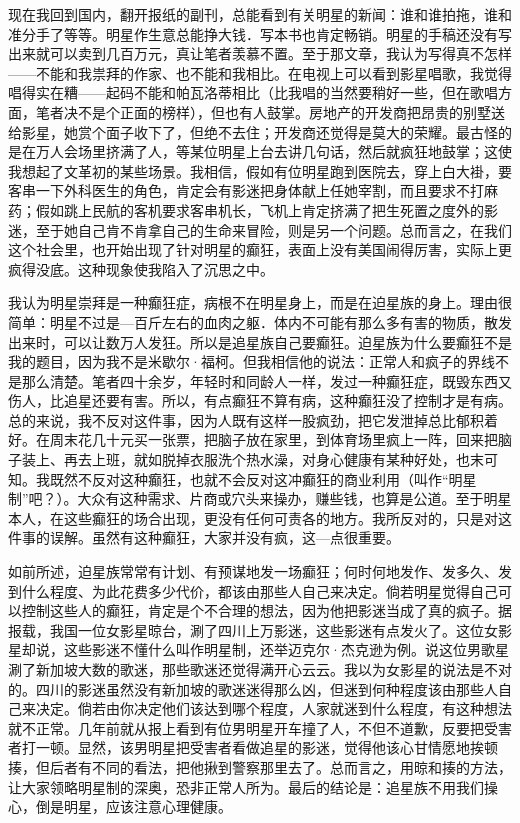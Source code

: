 现在我回到国内，翻开报纸的副刊，总能看到有关明星的新闻：谁和谁拍拖，谁和准分手了等等。明星作生意总能挣大钱．写本书也肯定畅销。明星的手稿还没有写出来就可以卖到几百万元，真让笔者羡慕不置。至于那文章，我认为写得真不怎样——不能和我祟拜的作家、也不能和我相比。在电视上可以看到影星唱歌，我觉得唱得实在糟——起码不能和帕瓦洛蒂相比（比我唱的当然要稍好一些，但在歌唱方面，笔者决不是个正面的榜样），但也有人鼓掌。房地产的开发商把昂贵的别墅送给影星，她赏个面子收下了，但绝不去住；开发商还觉得是莫大的荣耀。最古怪的是在万人会场里挤满了人，等某位明星上台去讲几句话，然后就疯狂地鼓掌；这使我想起了文革初的某些场景。我相信，假如有位明星跑到医院去，穿上白大褂，要客串一下外科医生的角色，肯定会有影迷把身体献上任她宰割，而且要求不打麻药；假如跳上民航的客机要求客串机长，飞机上肯定挤满了把生死置之度外的影迷，至于她自己肯不肯拿自己的生命来冒险，则是另一个问题。总而言之，在我们这个社会里，也开始出现了针对明星的癫狂，表面上没有美国闹得厉害，实际上更疯得没底。这种现象使我陷入了沉思之中。 

我认为明星崇拜是一种癫狂症，病根不在明星身上，而是在迫星族的身上。理由很简单：明星不过是—百斤左右的血肉之躯．体内不可能有那么多有害的物质，散发出来时，可以让数万人发狂。所以是追星族自己要癫狂。迫星族为什么要癫狂不是我的题目，因为我不是米歇尔·福柯。但我相信他的说法：正常人和疯子的界线不是那么清楚。笔者四十余岁，年轻时和同龄人一样，发过一种癫狂症，既毁东西又伤人，比追星还要有害。所以，有点癫狂不算有病，这种癫狂没了控制才是有病。总的来说，我不反对这件事，因为人既有这样一股疯劲，把它发泄掉总比郁积着好。在周末花几十元买一张票，把脑子放在家里，到体育场里疯上一阵，回来把脑子装上、再去上班，就如脱掉衣服洗个热水澡，对身心健康有某种好处，也末可知。我既然不反对这种癫狂，也就不会反对这冲癫狂的商业利用（叫作“明星制”吧？）。大众有这种需求、片商或穴头来操办，赚些钱，也算是公道。至于明星本人，在这些癫狂的场合出现，更没有任何可责各的地方。我所反对的，只是对这件事的误解。虽然有这种癫狂，大家并没有疯，这—点很重要。 

如前所述，迫星族常常有计划、有预谋地发一场癫狂；何时何地发作、发多久、发到什么程度、为此花费多少代价，都该由那些人自己来决定。倘若明星觉得自己可以控制这些人的癫狂，肯定是个不合理的想法，因为他把影迷当成了真的疯子。据报载，我国一位女影星晾台，涮了四川上万影迷，这些影迷有点发火了。这位女影星却说，这些影迷不懂什么叫作明星制，还举迈克尔·杰克逊为例。说这位男歌星涮了新加坡大数的歌迷，那些歌迷还觉得满开心云云。我以为女影星的说法是不对的。四川的影迷虽然没有新加坡的歌迷迷得那么凶，但迷到何种程度该由那些人自己来决定。倘若由你决定他们该达到哪个程度，人家就迷到什么程度，有这种想法就不正常。几年前就从报上看到有位男明星开车撞了人，不但不道歉，反要把受害者打一顿。显然，该男明星把受害者看做追星的影迷，觉得他该心甘情愿地挨顿揍，但后者有不同的看法，把他揪到警察那里去了。总而言之，用晾和揍的方法，让大家领略明星制的深奥，恐非正常人所为。最后的结论是：追星族不用我们操心，倒是明星，应该注意心理健康。 

